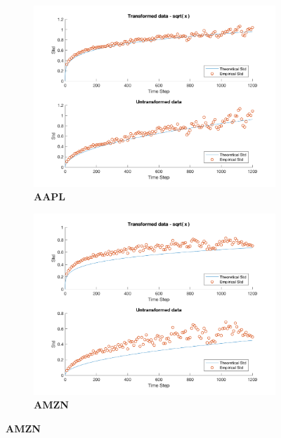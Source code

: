 \begin{figure}[htbp]

\centering

\begin{subfigure}[t]{0.49\textwidth}
\captionsetup{labelformat=empty}

\caption{\textbf{AAPL}}
\includegraphics[width=\textwidth]{2SDO_Fit/AAPL_Plot_GCHP2SDO_21600.png}

\end{subfigure}
\begin{subfigure}[t]{0.49\textwidth}
\captionsetup{labelformat=empty}

\caption{\textbf{AMZN}}
\includegraphics[width=\textwidth]{2SDO_Fit/AMZN_Plot_GCHP2SDO_21600.png}


\end{subfigure}
\end{figure}
